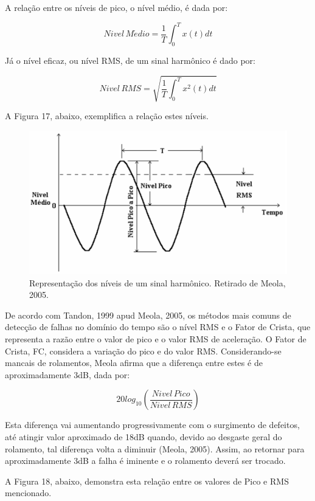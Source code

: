 \documentclass[
	12pt,				
	oneside,			
	a4paper,			
	english,			
	brazil				
	]{abntex2ppgsi}
\begin{document}
A relação entre os níveis de pico, o nível médio, é dada por:

\[Nivel \, M\acute{e}dio = \frac{1}{T} \int_{0}^{T} x(t)dt \]

Já o nível eficaz, ou nível RMS, de um sinal harmônico é dado por:

\[Nivel \, RMS = \sqrt{ \frac{1}{T} \int_{0}^{T} x^{2}(t)dt }  \]

A Figura 17, abaixo, exemplifica a relação estes níveis.

\begin{figure}[!htb]
\centering
\includegraphics{Figura17}
\caption {Representação dos níveis de um sinal harmônico. Retirado de Meola, 2005.}
\label{Figura17}
\end{figure}

De acordo com Tandon, 1999 apud Meola, 2005, os métodos mais comuns de detecção de falhas no domínio do tempo são o nível RMS e o Fator de Crista, que representa a razão entre o valor de pico e o valor RMS de aceleração. O Fator de Crista, FC, considera a variação do pico e do valor RMS. Considerando-se mancais de rolamentos, Meola afirma que a diferença entre estes é de aproximadamente 3dB, dada por:

\[20log_{10} \left ( \frac{Nivel \,Pico}{Nivel \, RMS} \right ) \]

Esta diferença vai aumentando progressivamente com o surgimento de defeitos, até atingir valor aproximado de 18dB quando, devido ao desgaste geral do rolamento, tal diferença volta a diminuir (Meola, 2005). Assim, ao retornar para aproximadamente 3dB a falha é iminente e o rolamento deverá ser trocado. 

A Figura 18, abaixo, demonstra esta relação entre os valores de Pico e RMS mencionado.  
\end{document}
